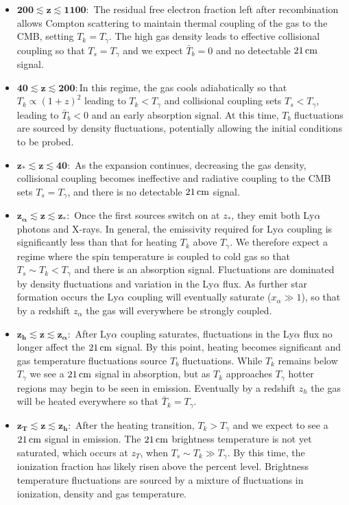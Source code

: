 \documentclass[a4paper,11pt]{article}
\begin{document}
\begin{itemize}
    \item $\mathbf{200\lesssim z\lesssim 1100:}$ The residual free electron fraction left after recombination allows Compton scattering to maintain thermal coupling of the gas to the CMB, setting $T_k=T_\gamma$. The high gas density leads to effective collisional coupling so that $T_s=T_\gamma$ and we expect $\bar{T}_b=0$ and no detectable $21\,{\rm cm}$ signal.
    \item $\mathbf{40\lesssim z\lesssim 200:}$In this regime, the gas cools adiabatically so that $T_k\propto(1+z)^2$ leading to $T_k<T_\gamma$ and collisional coupling sets $T_s<T_\gamma$, leading to $\bar{T}_b<0$ and an early absorption signal. At this time, $T_b$ fluctuations are sourced by density fluctuations, potentially allowing the initial conditions to be probed.
    \item $\mathbf{z_*\lesssim z\lesssim 40:}$ As the expansion continues, decreasing the gas density, collisional coupling becomes ineffective and radiative coupling to the CMB sets $T_s=T_\gamma$, and there is no detectable $21\,{\rm cm}$ signal.
    \item $\mathbf{z_\alpha\lesssim z\lesssim z_*:}$ Once the first sources switch on at $z_*$, they emit both Ly$\alpha$ photons and X-rays. In general, the emissivity required for Ly$\alpha$ coupling is significantly less than that for heating $T_k$ above $T_\gamma$. We therefore expect a regime where the spin temperature is coupled to cold gas so that $T_s\sim T_k<T_\gamma$ and there is an absorption signal. Fluctuations are dominated by density fluctuations and variation in the Ly$\alpha$ flux. As further star formation occurs the Ly$\alpha$ coupling will eventually saturate ($x_\alpha\gg1$), so that by a redshift $z_\alpha$ the gas will everywhere be strongly coupled.
    \item $\mathbf{z_h\lesssim z\lesssim z_\alpha:}$ After Ly$\alpha$ coupling saturates, fluctuations in the Ly$\alpha$ flux no longer affect the $21\,{\rm cm}$ signal. By this point, heating becomes significant and gas temperature fluctuations source $T_b$ fluctuations. While $T_k$ remains below $T_\gamma$ we see a $21\,{\rm cm}$ signal in absorption, but as $T_k$ approaches $T_\gamma$ hotter regions may begin to be seen in emission. Eventually by a redshift $z_h$ the gas will be heated everywhere so that $\bar{T}_k=T_\gamma$.
    \item $\mathbf{z_T\lesssim z\lesssim z_h:}$ After the heating transition, $T_k>T_\gamma$ and we expect to see a $21\,{\rm cm}$ signal in emission. The $21\,{\rm cm}$ brightness temperature is not yet saturated, which occurs at $z_T$, when $T_s\sim T_k\gg T_\gamma$. By this time, the ionization fraction has likely risen above the percent level. Brightness temperature fluctuations are sourced by a mixture of fluctuations in ionization, density and gas temperature.

\end{itemize}
\end{document}
